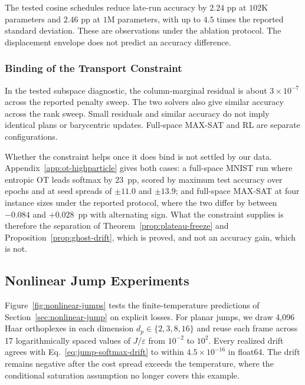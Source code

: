 The tested cosine schedules reduce late-run accuracy by $2.24$ pp at
$102$K parameters and $2.46$ pp at $1$M parameters, with up to $4.5$ times
the reported standard deviation. These are observations under the ablation
protocol. The displacement envelope does not predict an accuracy difference.

\subsubsection{Binding of the Transport Constraint}\label{sec:ot-binding}

In the tested subspace diagnostic, the column-marginal residual is about
$3\times10^{-7}$ across the reported penalty sweep. The two solvers also
give similar accuracy across the rank sweep. Small residuals and similar
accuracy do not imply identical plans or barycentric updates. Full-space
MAX-SAT and RL are separate configurations.

Whether the constraint helps once it does bind is not settled by our data.
Appendix~\ref{app:ot-highparticle} gives both cases: a full-space MNIST run where
entropic OT leads softmax by $23$~pp, scored by maximum test accuracy over epochs and at
seed spreads of $\pm 11.0$ and $\pm 13.9$; and full-space
MAX-SAT at four instance sizes under the reported protocol, where the two differ by
between $-0.084$ and $+0.028$~pp with alternating sign. What the constraint supplies is
therefore the separation of Theorem~\ref{prop:plateau-freeze} and
Proposition~\ref{prop:ghost-drift}, which is proved, and not an accuracy gain, which is
not.

\subsection{Nonlinear Jump Experiments}\label{sec:jump-experiments}

Figure~\ref{fig:nonlinear-jumps} tests the finite-temperature predictions of
Section~\ref{sec:nonlinear-jump} on explicit losses. For planar jumps, we draw
4,096 Haar orthoplexes in each dimension $d_p\in\{2,3,8,16\}$ and reuse each
frame across 17 logarithmically spaced values of $J/\varepsilon$ from
$10^{-2}$ to $10^2$. Every realized drift agrees with
Eq.~\ref{eq:jump-softmax-drift} to within $4.5\times10^{-16}$ in float64.
The drift remains negative after the cost spread exceeds the temperature,
where the conditional saturation assumption no longer covers this example.

